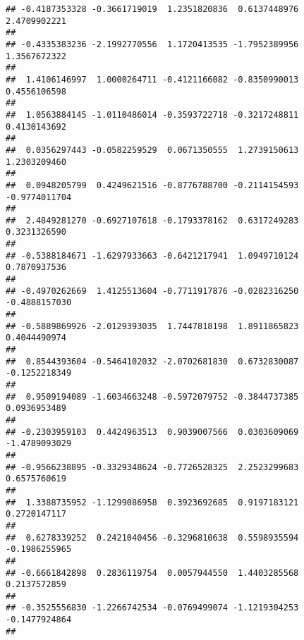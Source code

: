 \documentclass[]{article}
\begin{document}
\begin{verbatim}
## -0.4187353328 -0.3661719019  1.2351820836  0.6137448976  2.4709902221 
##                                                                       
## -0.4335383236 -2.1992770556  1.1720413535 -1.7952389956  1.3567672322 
##                                                                       
##  1.4106146997  1.0000264711 -0.4121166082 -0.8350990013  0.4556106598 
##                                                                       
##  1.0563884145 -1.0110486014 -0.3593722718 -0.3217248811  0.4130143692 
##                                                                       
##  0.0356297443 -0.0582259529  0.0671350555  1.2739150613  1.2303209460 
##                                                                       
##  0.0948205799  0.4249621516 -0.8776788700 -0.2114154593 -0.9774011704 
##                                                                       
##  2.4849281270 -0.6927107618 -0.1793378162  0.6317249283  0.3231326590 
##                                                                       
## -0.5388184671 -1.6297933663 -0.6421217941  1.0949710124  0.7870937536 
##                                                                       
## -0.4970262669  1.4125513604 -0.7711917876 -0.0282316250 -0.4888157030 
##                                                                       
## -0.5889869926 -2.0129393035  1.7447818198  1.8911865823  0.4044490974 
##                                                                       
##  0.8544393604 -0.5464102032 -2.0702681830  0.6732830087 -0.1252218349 
##                                                                       
##  0.9509194089 -1.6034663248 -0.5972079752 -0.3844737385  0.0936953489 
##                                                                       
## -0.2303959103  0.4424963513  0.9039007566  0.0303609069 -1.4789093029 
##                                                                       
## -0.9566238895 -0.3329348624 -0.7726528325  2.2523299683  0.6575760619 
##                                                                       
##  1.3388735952 -1.1299086958  0.3923692685  0.9197183121  0.2720147117 
##                                                                       
##  0.6278339252  0.2421040456 -0.3296810638  0.5598935594 -0.1986255965 
##                                                                       
## -0.6661842898  0.2836119754  0.0057944550  1.4403285568  0.2137572859 
##                                                                       
## -0.3525556830 -1.2266742534 -0.0769499074 -1.1219304253 -0.1477924864 
##                                                                       

\end{verbatim}
\end{document}
